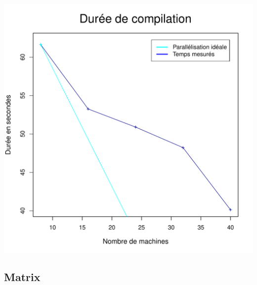 \documentclass[a4paper, 11pt, titlepage]{article}
\begin{document}
\begin{center}
    \includegraphics[scale=0.6]{res/sujet_makefiles_blender_259_Makefile_nth1.pdf}
\end{center}



\subsection {Matrix}
\end{document}
